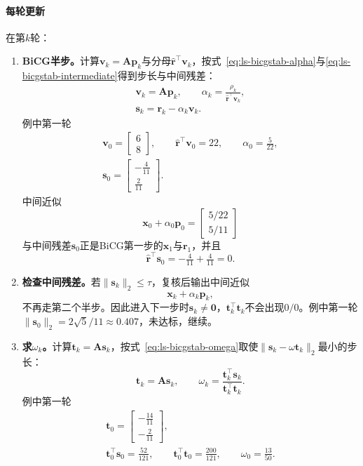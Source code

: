 \paragraph{每轮更新}
在第$k$轮：
\begin{enumerate}
 \item \textbf{BiCG半步。}计算$\bm v_k=\bm A\bm p_k$与分母$\widehat{\bm r}^\top\bm v_k$，按式~\eqref{eq:ls-bicgstab-alpha}与\eqref{eq:ls-bicgstab-intermediate}得到步长与中间残差：
 \[
  \begin{gathered}
  \bm v_k=\bm A\bm p_k,\qquad \alpha_k=\frac{\rho_k}{\widehat{\bm r}^\top\bm v_k},\\
  \bm s_k=\bm r_k-\alpha_k\bm v_k .
  \end{gathered}
 \]
 例中第一轮
 \[
  \begin{gathered}
  \bm v_0=\begin{bmatrix}6\\8\end{bmatrix},\qquad \widehat{\bm r}^\top\bm v_0=22,\qquad \alpha_0=\frac5{22},\\
  \bm s_0=\begin{bmatrix}-\tfrac4{11}\\\tfrac2{11}\end{bmatrix}.
  \end{gathered}
 \]
 中间近似
 \[
  \bm x_0+\alpha_0\bm p_0=\begin{bmatrix}5/22\\5/11\end{bmatrix}
 \]
 与中间残差$\bm s_0$正是BiCG第一步的$\bm x_1$与$\bm r_1$，并且
 \[
  \widehat{\bm r}^\top\bm s_0=-\tfrac4{11}+\tfrac4{11}=0 .
 \]

 \item \textbf{检查中间残差。}若$\lVert\bm s_k\rVert_2\le\tau$，复核后输出中间近似
 \[
  \bm x_k+\alpha_k\bm p_k ,
 \]
 不再走第二个半步。因此进入下一步时$\bm s_k\ne\bm 0$，$\bm t_k^\top\bm t_k$不会出现$0/0$。例中第一轮$\lVert\bm s_0\rVert_2=2\sqrt5/11\approx0.407$，未达标，继续。

 \item \textbf{求$\omega_k$。}计算$\bm t_k=\bm A\bm s_k$，按式~\eqref{eq:ls-bicgstab-omega}取使$\lVert\bm s_k-\omega\bm t_k\rVert_2$最小的步长：
 \[
  \bm t_k=\bm A\bm s_k,\qquad \omega_k=\frac{\bm t_k^\top\bm s_k}{\bm t_k^\top\bm t_k}.
 \]
 例中第一轮
 \[
  \begin{gathered}
  \bm t_0=\begin{bmatrix}-\tfrac{14}{11}\\-\tfrac2{11}\end{bmatrix},\\
  \bm t_0^\top\bm s_0=\frac{52}{121},\qquad
  \bm t_0^\top\bm t_0=\frac{200}{121},\qquad
  \omega_0=\frac{13}{50}.
  \end{gathered}
 \]


\end{enumerate}
